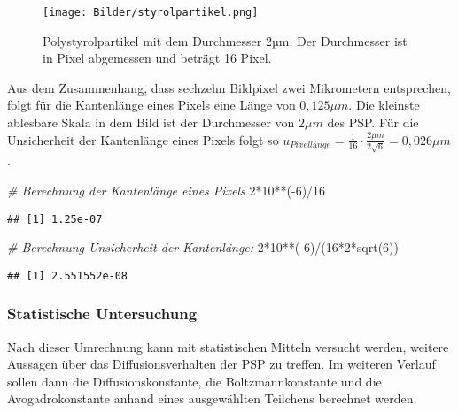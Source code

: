 \documentclass[class=article, crop=false]{standalone}
\newenvironment{Shaded}{\begin{snugshade}}{\end{snugshade}}
\newcommand{\CommentTok}[1]{\textcolor[rgb]{0.56,0.35,0.01}{\textit{#1}}}
\newcommand{\DecValTok}[1]{\textcolor[rgb]{0.00,0.00,0.81}{#1}}
\newcommand{\FunctionTok}[1]{\textcolor[rgb]{0.00,0.00,0.00}{#1}}
\newcommand{\NormalTok}[1]{#1}
\newcommand{\SpecialCharTok}[1]{\textcolor[rgb]{0.00,0.00,0.00}{#1}}
\begin{document}
\begin{figure}
\centering
\texttt{[image: Bilder/styrolpartikel.png]}
\caption{Polystyrolpartikel mit dem Durchmesser 2µm. Der Durchmesser ist
in Pixel abgemessen und beträgt 16 Pixel.}
\end{figure}

Aus dem Zusammenhang, dass sechzehn Bildpixel zwei Mikrometern
entsprechen, folgt für die Kantenlänge eines Pixels eine Länge von
\(0,125 \mu m\). Die kleinste ablesbare Skala in dem Bild ist der
Durchmesser von \(2\mu m\) des PSP. Für die Unsicherheit der Kantenlänge
eines Pixels folgt so
\(u_{Pixellänge} = \frac{1}{16}\cdot \frac{2\mu m}{2\sqrt{6}} = 0,026\mu m\).

\begin{Shaded}
\begin{Highlighting}[]
\CommentTok{\# Berechnung der Kantenlänge eines Pixels}
\DecValTok{2}\SpecialCharTok{*}\DecValTok{10}\SpecialCharTok{**}\NormalTok{(}\SpecialCharTok{{-}}\DecValTok{6}\NormalTok{)}\SpecialCharTok{/}\DecValTok{16}
\end{Highlighting}
\end{Shaded}

\begin{verbatim}
## [1] 1.25e-07
\end{verbatim}

\begin{Shaded}
\begin{Highlighting}[]
\CommentTok{\# Berechnung Unsicherheit der Kantenlänge:}
\DecValTok{2}\SpecialCharTok{*}\DecValTok{10}\SpecialCharTok{**}\NormalTok{(}\SpecialCharTok{{-}}\DecValTok{6}\NormalTok{)}\SpecialCharTok{/}\NormalTok{(}\DecValTok{16}\SpecialCharTok{*}\DecValTok{2}\SpecialCharTok{*}\FunctionTok{sqrt}\NormalTok{(}\DecValTok{6}\NormalTok{))}
\end{Highlighting}
\end{Shaded}

\begin{verbatim}
## [1] 2.551552e-08
\end{verbatim}

\hypertarget{statistische-untersuchung}{%
\subsubsection{Statistische
Untersuchung}\label{statistische-untersuchung}}

Nach dieser Umrechnung kann mit statistischen Mitteln versucht werden,
weitere Aussagen über das Diffusionsverhalten der PSP zu treffen. Im
weiteren Verlauf sollen dann die Diffusionskonstante, die
Boltzmannkonstante und die Avogadrokonstante anhand eines ausgewählten
Teilchens berechnet werden.
\end{document}
